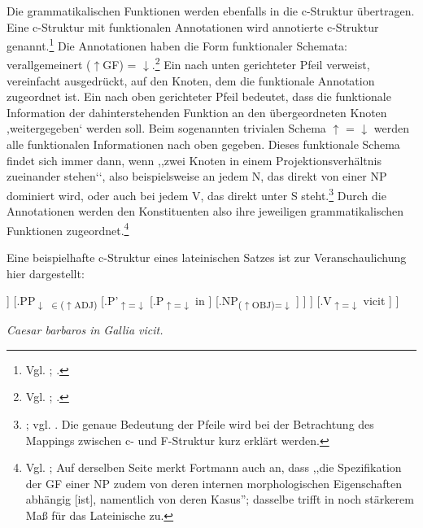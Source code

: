 \documentclass[12pt,a4paper]{article}
\begin{document}
Die grammatikalischen Funktionen werden ebenfalls in die c-Struktur übertragen. Eine c-Struktur mit funktionalen Annotationen wird annotierte c-Struktur genannt.\footnote{Vgl. \cite[69]{Falk}; \cite[22]{Rohrer}.} Die Annotationen haben die Form funktionaler Schemata: verallgemeinert ($\uparrow$GF) = $\downarrow$.\footnote{Vgl. \cite[33]{Rohrer}; \cite[15-6]{Skript}.} Ein nach unten gerichteter Pfeil verweist, vereinfacht ausgedrückt, auf den Knoten, dem die funktionale Annotation zugeordnet ist. Ein nach oben gerichteter Pfeil bedeutet, dass die funktionale Information der dahinterstehenden Funktion an den übergeordneten Knoten ,weitergegeben‘ werden soll. Beim sogenannten trivialen Schema $\uparrow$ = $\downarrow$ werden alle funktionalen Informationen nach oben gegeben. Dieses funktionale Schema findet sich immer dann, wenn ,,zwei Knoten in einem Projektionsverhältnis zueinander stehen‘‘, also beispielsweise an jedem N, das direkt von einer NP dominiert wird, oder auch bei jedem V, das direkt unter S steht.\footnote{\cite[28]{Skript}; vgl. \cite[25; 33]{Rohrer}. Die genaue Bedeutung der Pfeile wird bei der Betrachtung des Mappings zwischen c- und F-Struktur kurz erklärt werden.} Durch die Annotationen werden den Konstituenten also ihre jeweiligen grammatikalischen Funktionen zugeordnet.\footnote{Vgl. \cite[28]{Skript}; Auf derselben Seite merkt Fortmann auch an, dass ,,die Spezifikation der GF einer NP zudem von deren internen morphologischen Eigenschaften abhängig [ist], namentlich von deren Kasus''; dasselbe trifft in noch stärkerem Maß für das Lateinische zu.}

Eine beispielhafte c-Struktur eines lateinischen Satzes ist zur Veranschaulichung hier dargestellt:

\begin{singlespace}
\Tree [.S 
		[.{NP\textsubscript{($\uparrow$OBJ)=$\downarrow$}}
			[.N\textsubscript{$\uparrow$=$\downarrow$} barbaros ]
		]							
		[.{PP\textsubscript{$\downarrow$ $\in$($\uparrow$ADJ)}}
			[.P'\textsubscript{$\uparrow$=$\downarrow$}						
				[.P\textsubscript{$\uparrow$=$\downarrow$} in ]
				[.{NP\textsubscript{($\uparrow$OBJ)=$\downarrow$}} ]
			]
        ] 	
        [.V\textsubscript{$\uparrow$=$\downarrow$} vicit ]						
	]
\end{singlespace}

\textit{Caesar barbaros in Gallia vicit.} \\
\end{document}
